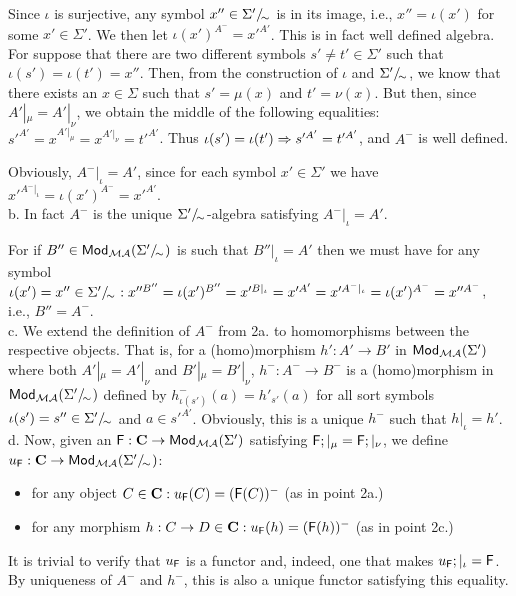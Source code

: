 \begin{PROOF}
Since $\iota$ is surjective, any symbol $x''\in\Sigma'/\!_{\sim_{}}$ is in
its image, i.e., $x''=\iota(x')$ for some $x'\in\Sigma'$. We then let
$\iota(x')^{A^{-}}=x'^{A'}$. This is in fact well defined algebra. For suppose
that there are two different symbols $s'\not= t'\in\Sigma'$ such that
$\iota(s')=\iota(t')=x''$. Then, from the construction of $\iota$ and
$\Sigma'/\!_{\sim_{}}$, we know that there exists an $x\in\Sigma$ such that
$s'=\mu(x)$ and $t'=\nu(x)$. But then, since 
$A'|_\mu=A'|_\nu$, we obtain the middle of the following equalities:
$s'^{A'}=x^{A'|_{\mu}}=x^{A'|_{\nu}}=t'^{A'}$. Thus
$\iota(s')=\iota(t')\Rightarrow s'^{A'}=t'^{A'}$, and $A^{-}$ is well defined.

Obviously, $A^{-}|_\iota = A'$, since for each symbol $x'\in\Sigma'$ we have
$x'^{A^{-}|_{\iota}} = \iota(x')^{A^{-}} = x'^{A'}$.
\\[1ex]
b. In fact $A^{-}$ is the unique $\Sigma'/\!_{\sim_{}}$-algebra satisfying
   $A^{-}|_\iota=A'$. 

For if $B''\in{\sf {Mod}}_{{\mathcal{MA}}}(\Sigma'/\!_{\sim_{}})$ is such that
   $B''|_\iota=A'$ then we must have for any symbol
   $\iota(x')=x''\in\Sigma'/\!_{\sim_{}}: x''^{B''}=\iota(x')^{B''} =
   x'^{B|_{\iota}} = x'^{A'} = x'^{A^{-}|_{\iota}} = \iota(x')^{A^{-}}=
   x''^{A^{-}}$, i.e., $B''=A^{-}$.
\\[1ex]
c. We extend the definition of $A^-$ from 2a. to homomorphisms between the
respective objects. That is, for a (homo)morphism $h':A'\to B'$ in ${\sf {Mod}}_{{\mathcal{MA}}}(\Sigma')$ where both
$A'|_\mu=A'|_\nu$ and $B'|_\mu=B'|_\nu$, $h^-:A^-\to B^-$ is a (homo)morphism
in ${\sf {Mod}}_{{\mathcal{MA}}}(\Sigma'/\!_{\sim_{}})$ defined by $h^-_{\iota(s')}(a)=h'_{s'}(a)$
for all sort symbols $\iota(s')=s''\in\Sigma'/\!_{\sim_{}}$ and $a\in
s'^{A'}$. Obviously, this is a unique $h^-$ such that $h|_\iota = h'$.
\\[1ex]
d. Now, given an ${\sf {F}}:{\bf C}\to {\sf {Mod}}_{{\mathcal{MA}}}(\Sigma')$ satisfying ${\sf {F}};|_\mu={\sf {F}};|_\nu$, we define $u_{{\sf {F}}}:{\bf C}\to {\sf {Mod}}_{{\mathcal{MA}}}(\Sigma'/\!_{\sim_{}})$:
\begin{itemize}\MyLPar
\item for any object $C\in{\bf C}:u_{{\sf {F}}}(C) = ({\sf {F}}(C))^-$ (as in point 2a.)
\item for any morphism $h:C\to D\in {\bf C}: u_{{\sf {F}}}(h) = ({\sf {F}}(h))^-$ (as
in point 2c.)
\end{itemize}
It is trivial to verify that $u_{{\sf {F}}}$ is a functor and, indeed, one that
makes $u_{{\sf {F}}};|_\iota={\sf {F}}$. By uniqueness of $A^-$ and $h^-$,
this is also a unique functor satisfying this equality.
\end{PROOF}
